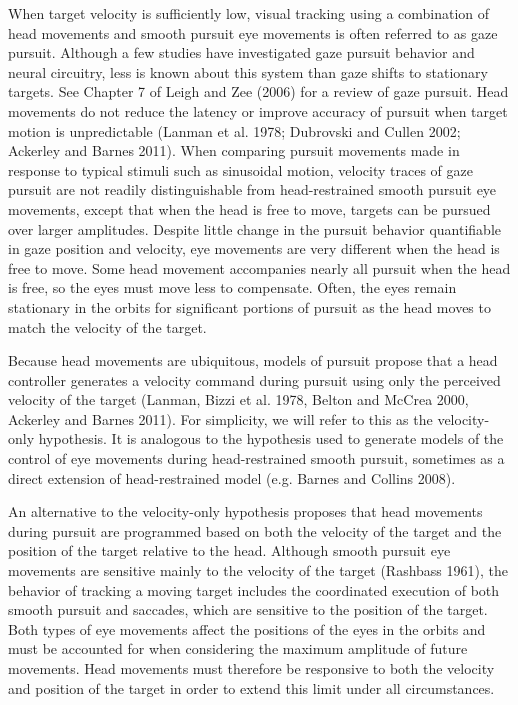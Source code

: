 \documentclass[12pt]{article}
\begin{document}
When target velocity is sufficiently low, visual tracking using a combination of head movements and smooth pursuit eye movements is often referred to as gaze pursuit. Although a few studies have investigated gaze pursuit behavior and neural circuitry, less is known about this system than gaze shifts to stationary targets. See Chapter 7 of Leigh and Zee (2006) for a review of gaze pursuit. Head movements do not reduce the latency or improve accuracy of pursuit when target motion is unpredictable (Lanman et al. 1978; Dubrovski and Cullen 2002; Ackerley and Barnes 2011). When comparing pursuit movements made in response to typical stimuli such as sinusoidal motion, velocity traces of gaze pursuit are not readily distinguishable from head-restrained smooth pursuit eye movements, except that when the head is free to move, targets can be pursued over larger amplitudes. Despite little change in the pursuit behavior quantifiable in gaze position and velocity, eye movements are very different when the head is free to move. Some head movement accompanies nearly all pursuit when the head is free, so the eyes must move less to compensate. Often, the eyes remain stationary in the orbits for significant portions of pursuit as the head moves to match the velocity of the target.

Because head movements are ubiquitous, models of pursuit propose that a head controller generates a velocity command during pursuit using only the perceived velocity of the target (Lanman, Bizzi et al. 1978, Belton and McCrea 2000, Ackerley and Barnes 2011). For simplicity, we will refer to this as the velocity-only hypothesis. It is analogous to the hypothesis used to generate models of the control of eye movements during head-restrained smooth pursuit, sometimes as a direct extension of head-restrained model (e.g. Barnes and Collins 2008).
 
An alternative to the velocity-only hypothesis proposes that head movements during pursuit are programmed based on both the velocity of the target and the position of the target relative to the head.  Although smooth pursuit eye movements are sensitive mainly to the velocity of the target (Rashbass 1961), the behavior of tracking a moving target includes the coordinated execution of both smooth pursuit and saccades, which are sensitive to the position of the target. Both types of eye movements affect the positions of the eyes in the orbits and must be accounted for when considering the maximum amplitude of future movements. Head movements must therefore be responsive to both the velocity and position of the target in order to extend this limit under all circumstances.
\end{document}
